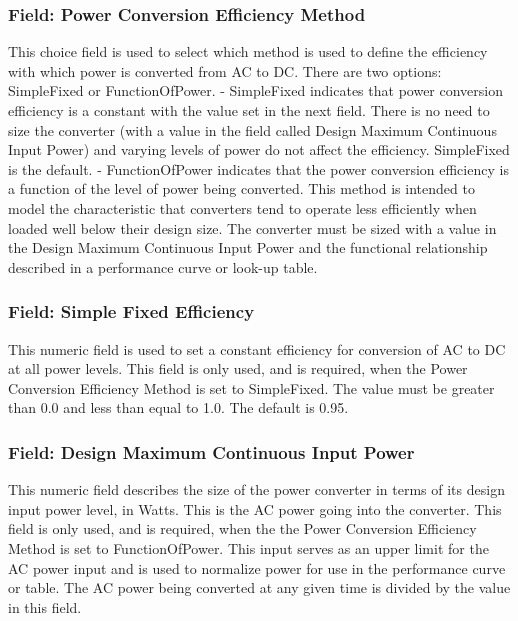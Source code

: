 \subsubsection{Field: Power Conversion Efficiency Method}\label{field-power-conversion-efficiency-method}

This choice field is used to select which method is used to define the efficiency with which power is converted from AC to DC. There are two options: SimpleFixed or FunctionOfPower. - SimpleFixed indicates that power conversion efficiency is a constant with the value set in the next field. There is no need to size the converter (with a value in the field called Design Maximum Continuous Input Power) and varying levels of power do not affect the efficiency. SimpleFixed is the default. - FunctionOfPower indicates that the power conversion efficiency is a function of the level of power being converted. This method is intended to model the characteristic that converters tend to operate less efficiently when loaded well below their design size. The converter must be sized with a value in the Design Maximum Continuous Input Power and the functional relationship described in a performance curve or look-up table.

\subsubsection{Field: Simple Fixed Efficiency}\label{field-simple-fixed-efficiency}

This numeric field is used to set a constant efficiency for conversion of AC to DC at all power levels. This field is only used, and is required, when the Power Conversion Efficiency Method is set to SimpleFixed. The value must be greater than 0.0 and less than equal to 1.0. The default is 0.95.

\subsubsection{Field: Design Maximum Continuous Input Power}\label{field-design-maximum-continuous-input-power}

This numeric field describes the size of the power converter in terms of its design input power level, in Watts. This is the AC power going into the converter. This field is only used, and is required, when the the Power Conversion Efficiency Method is set to FunctionOfPower. This input serves as an upper limit for the AC power input and is used to normalize power for use in the performance curve or table. The AC power being converted at any given time is divided by the value in this field.

